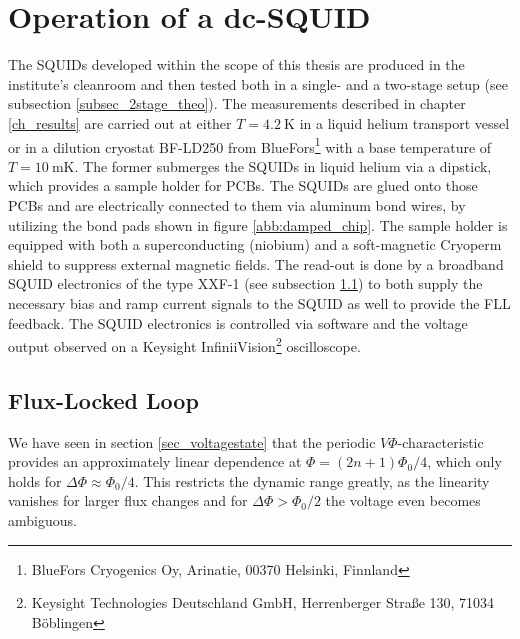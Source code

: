 \section{Operation of a dc-SQUID}\label{sec_operation}


The SQUIDs developed within the scope of this thesis are produced in the institute's cleanroom and then tested both in a single- and a two-stage setup (see subsection \ref{subsec_2stage_theo}). The measurements described in chapter \ref{ch_results} are carried out at either $T=\qty{4.2}{\kelvin}$ in a liquid helium transport vessel or in a dilution cryostat BF-LD250 from BlueFors\footnote{BlueFors Cryogenics Oy, Arinatie, 00370 Helsinki, Finnland} with a base temperature of $T=\qty{10}{\milli\kelvin}$. The former submerges the SQUIDs in liquid helium via a dipstick, which provides a sample holder for PCBs. The SQUIDs are glued onto those PCBs and are electrically connected to them via aluminum bond wires, by utilizing the bond pads shown in figure \ref{abb:damped_chip}. The sample holder is equipped with both a superconducting (niobium) and a soft-magnetic Cryoperm shield to suppress external magnetic fields. The read-out is done by a broadband SQUID electronics of the type XXF-1 (see subsection \ref{subsec_fll}) to both supply the necessary bias and ramp current signals to the SQUID as well to provide the FLL feedback. The SQUID electronics is controlled via software and the voltage output observed on a Keysight InfiniiVision\footnote{Keysight Technologies Deutschland GmbH, Herrenberger Straße 130, 71034 Böblingen} oscilloscope.  

\subsection{Flux-Locked Loop}\label{subsec_fll}

We have seen in section \ref{sec_voltagestate} that the periodic $V\Phi$-characteristic provides an approximately linear dependence at $\Phi = (2n+1)\Phi_0/4$, which only holds for $\Delta\Phi\approx\Phi_0/4$. This restricts the dynamic range greatly, as the linearity vanishes for larger flux changes and for $\Delta\Phi>\Phi_0/2$ the voltage even becomes ambiguous. 

